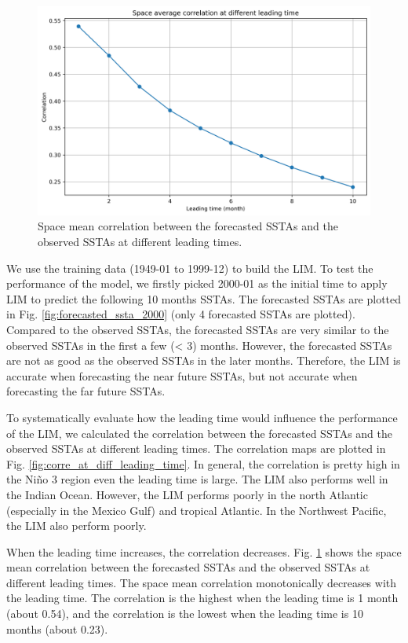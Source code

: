 \documentclass[12pt,a4paper]{article}
\begin{document}
\begin{figure}
\centering
\includegraphics[width=\textwidth]{figures/corre_at_diff_leading_time_mean.png}
\caption{Space mean correlation between the forecasted SSTAs and the observed SSTAs at different leading times.}
\label{fig:corre_at_diff_leading_time_mean}
\end{figure}

We use the training data (1949-01 to 1999-12) to build the LIM. To test the performance of the model, we firstly picked 2000-01 as the initial time to apply LIM to predict the following 10 months SSTAs. The forecasted SSTAs are plotted in Fig. \ref{fig:forecasted_ssta_2000} (only 4 forecasted SSTAs are plotted). Compared to the observed SSTAs, the forecasted SSTAs are very similar to the observed SSTAs in the first a few (< 3) months. However, the forecasted SSTAs are not as good as the observed SSTAs in the later months. Therefore, the LIM is accurate when forecasting the near future SSTAs, but not accurate when forecasting the far future SSTAs.

To systematically evaluate how the leading time would influence the performance of the LIM, we calculated the correlation between the forecasted SSTAs and the observed SSTAs at different leading times. The correlation maps are plotted in Fig. \ref{fig:corre_at_diff_leading_time}. In general, the correlation is pretty high in the Ni\~no 3 region even the leading time is large. The LIM also performs well in the Indian Ocean. However, the LIM performs poorly in the north Atlantic (especially in the Mexico Gulf) and tropical Atlantic. In the Northwest Pacific, the LIM also perform poorly.

When the leading time increases, the correlation decreases. Fig. \ref{fig:corre_at_diff_leading_time_mean} shows the space mean correlation between the forecasted SSTAs and the observed SSTAs at different leading times. The space mean correlation monotonically decreases with the leading time. The correlation is the highest when the leading time is 1 month (about 0.54), and the correlation is the lowest when the leading time is 10 months (about 0.23).
\end{document}
